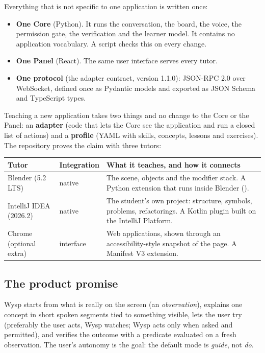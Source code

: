 Everything that is not specific to one application is written once:

\begin{itemize}[leftmargin=1.2em]
  \item \textbf{One Core} (Python). It runs the conversation, the board, the voice, the permission gate, the verification and the learner model. It contains no application vocabulary. A script checks this on every change.
  \item \textbf{One Panel} (React). The same user interface serves every tutor.
  \item \textbf{One protocol} (the adapter contract, version 1.1.0): JSON-RPC 2.0 over WebSocket, defined once as Pydantic models and exported as JSON Schema and TypeScript types.
\end{itemize}

Teaching a new application takes two things and no change to the Core or the Panel: an \textbf{adapter} (code that lets the Core see the application and run a closed list of actions) and a \textbf{profile} (YAML with skills, concepts, lessons and exercises). The repository proves the claim with three tutors:

\begin{center}
\small
\begin{tabularx}{\textwidth}{@{}L{2.9cm}L{2.5cm}Y@{}}
\toprule
\textbf{Tutor} & \textbf{Integration} & \textbf{What it teaches, and how it connects} \\
\midrule
Blender (5.2 LTS) & native & The scene, objects and the modifier stack. A Python extension that runs inside Blender (). \\
IntelliJ IDEA (2026.2) & native & The student's own project: structure, symbols, problems, refactorings. A Kotlin plugin built on the IntelliJ Platform. \\
Chrome (optional extra) & interface & Web applications, shown through an accessibility-style snapshot of the page. A Manifest V3 extension. \\
\bottomrule
\end{tabularx}
\end{center}

\subsection*{The product promise}

\begin{keybox}
Wysp starts from what is really on the screen (an \emph{observation}), explains one concept in short spoken segments tied to something visible, lets the user try (preferably the user acts, Wysp watches; Wysp acts only when asked and permitted), and verifies the outcome with a predicate evaluated on a fresh observation. The user's autonomy is the goal: the default mode is \emph{guide}, not \emph{do}.
\end{keybox}

